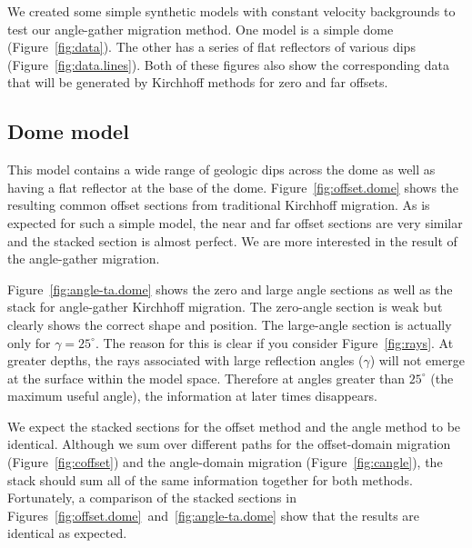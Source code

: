 
We created some simple synthetic models with constant velocity backgrounds
to test our angle-gather migration method.  One model is a simple dome 
(Figure~\ref{fig:data}).  The other has a series of flat reflectors of 
various dips (Figure~\ref{fig:data.lines}).  Both of these figures also
show the corresponding data that will be generated by Kirchhoff methods
for zero and far offsets.



\par
\subsection{Dome model}

This model contains a wide range of geologic dips across the dome as well
as having a flat reflector at the base of the dome.  
Figure~\ref{fig:offset.dome} shows the resulting common offset sections from
traditional Kirchhoff migration.  As is expected for such a simple model,
the near and far offset sections are very similar and the stacked section
is almost perfect.  We are more interested in the result of the angle-gather
migration.

Figure~\ref{fig:angle-ta.dome} shows the zero and large angle sections as well
as the stack for angle-gather Kirchhoff migration.  The zero-angle section
is weak but clearly shows the correct shape and position.  The large-angle
section is actually only for $\gamma=25^{\circ}$. 
The reason for this is clear if you consider Figure~\ref{fig:rays}.  At 
greater depths, the rays associated with large reflection angles ($\gamma$)
will not emerge at the surface within the model space.  Therefore at angles
greater than $25^{\circ}$ (the maximum useful angle), the information at later 
times disappears.  

We expect the stacked sections for the offset method and the angle method 
to be identical.  Although we sum over different paths for the offset-domain 
migration (Figure~\ref{fig:coffset}) and the angle-domain migration 
(Figure~\ref{fig:cangle}), the stack should sum all of the same information
together for both methods.  Fortunately, a comparison of the stacked sections
in Figures~\ref{fig:offset.dome}~and~\ref{fig:angle-ta.dome} show that the
results are identical as expected.
 
